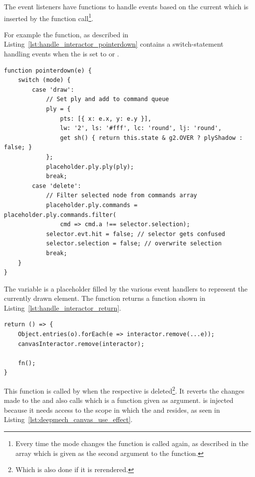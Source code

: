 The event listeners have functions to handle events based on the current  which is inserted by the function call\footnote{Every time the mode changes the function is called again, as described in the array which is given as the second argument to the  function.}.

For example the  function, as described in Listing~\ref{lst:handle_interactor_pointerdown} contains a switch-statement handling events when the  is set to  or .

\begin{lstlisting}[label={lst:handle_interactor_pointerdown}, caption={\code{pointerdown} function in \code{handleInteractor}.}]
function pointerdown(e) {
    switch (mode) {
        case 'draw':
            // Set ply and add to command queue
            ply = {
                pts: [{ x: e.x, y: e.y }],
                lw: '2', ls: '#fff', lc: 'round', lj: 'round',
                get sh() { return this.state & g2.OVER ? plyShadow : false; }
            };
            placeholder.ply.ply(ply);
            break;
        case 'delete':
            // Filter selected node from commands array
            placeholder.ply.commands = placeholder.ply.commands.filter(
                cmd => cmd.a !== selector.selection);
            selector.evt.hit = false; // selector gets confused
            selector.selection = false; // overwrite selection
            break;
    }
}
\end{lstlisting}


The  variable is a placeholder filled by the various event handlers to represent the currently drawn  element.
The  function returns a function shown in Listing~\ref{lst:handle_interactor_return}.

\begin{lstlisting}[label={lst:handle_interactor_return}, caption={Return value of \code{handleInteractor}.}]
return () => {
    Object.entries(o).forEach(e => interactor.remove(...e));
    canvasInteractor.remove(interactor);

    fn();
}
\end{lstlisting}

This function is called by  when the respective  is deleted\footnote{Which is also done if it is rerendered.}.
It reverts the changes made to the  and also calls  which is a function given as argument.
 is injected because it needs access to the scope in which the  and  resides, as seen in Listing~\ref{lst:deepmech_canvas_use_effect}.

